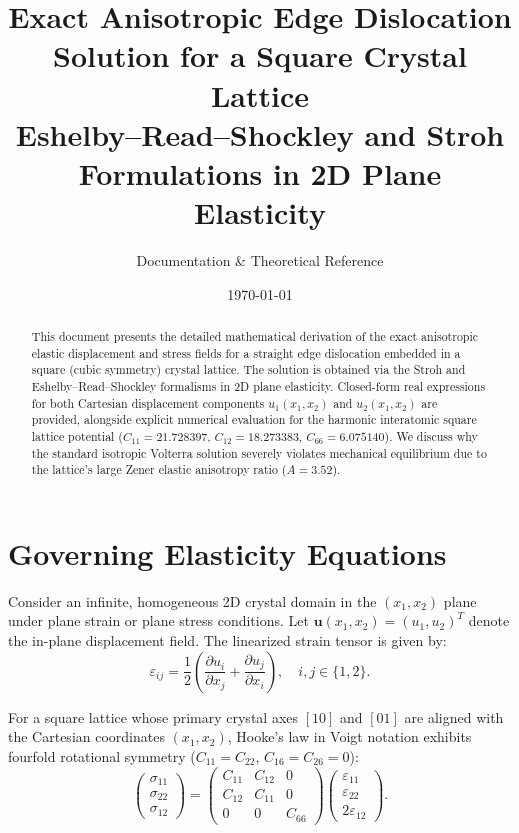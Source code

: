 \documentclass[11pt,a4paper]{article}
\title{\textbf{Exact Anisotropic Edge Dislocation Solution for a Square Crystal Lattice}\\[0.5em]
\large Eshelby--Read--Shockley and Stroh Formulations in 2D Plane Elasticity}
\author{Documentation \& Theoretical Reference}
\date{\today}
\begin{document}
\maketitle

\begin{abstract}
This document presents the detailed mathematical derivation of the exact anisotropic elastic displacement and stress fields for a straight edge dislocation embedded in a square (cubic symmetry) crystal lattice. The solution is obtained via the Stroh and Eshelby--Read--Shockley formalisms in 2D plane elasticity. Closed-form real expressions for both Cartesian displacement components $u_1(x_1, x_2)$ and $u_2(x_1, x_2)$ are provided, alongside explicit numerical evaluation for the harmonic interatomic square lattice potential ($C_{11} = 21.728397$, $C_{12} = 18.273383$, $C_{66} = 6.075140$). We discuss why the standard isotropic Volterra solution severely violates mechanical equilibrium due to the lattice's large Zener elastic anisotropy ratio ($A = 3.52$).
\end{abstract}

\section{Governing Elasticity Equations}

Consider an infinite, homogeneous 2D crystal domain in the $(x_1, x_2)$ plane under plane strain or plane stress conditions. Let $\bm{u}(x_1, x_2) = (u_1, u_2)^T$ denote the in-plane displacement field. The linearized strain tensor is given by:
\begin{equation}
\varepsilon_{ij} = \frac{1}{2} \left( \frac{\partial u_i}{\partial x_j} + \frac{\partial u_j}{\partial x_i} \right), \quad i, j \in \{1, 2\}.
\end{equation}

For a square lattice whose primary crystal axes $[10]$ and $[01]$ are aligned with the Cartesian coordinates $(x_1, x_2)$, Hooke's law in Voigt notation exhibits fourfold rotational symmetry ($C_{11} = C_{22}$, $C_{16} = C_{26} = 0$):
\begin{equation}
\begin{pmatrix}
\sigma_{11} \\
\sigma_{22} \\
\sigma_{12}
\end{pmatrix}
=
\begin{pmatrix}
C_{11} & C_{12} & 0 \\
C_{12} & C_{11} & 0 \\
0 & 0 & C_{66}
\end{pmatrix}
\begin{pmatrix}
\varepsilon_{11} \\
\varepsilon_{22} \\
2\varepsilon_{12}
\end{pmatrix}.
\end{equation}
\end{document}
